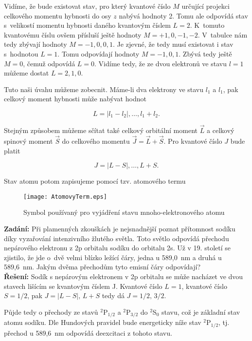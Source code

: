 Vidíme, že bude existovat stav, pro který kvantové číslo $M$ určující projekci celkového momentu hybnosti do osy $z$ nabývá hodnoty 2. Tomu ale odpovídá stav s~velikostí momentu hybnosti daného kvantovým číslem $L = 2$. K~tomuto kvantovému číslu ovšem přísluší ještě hodnoty $M=+1,0,-1,-2$. V~tabulce nám tedy zbývají hodnoty $M =-1,0,0,1$. Je zjevné, že tedy musí existovat i stav s~hodnotou $L=1$. Tomu odpovídají hodnoty $M=-1,0, 1$. Zbývá tedy ještě $M=0$, čemuž odpovídá $L=0$. Vidíme tedy, že ze dvou elektronů ve stavu $l=1$ můžeme dostat $L=2,1,0$. 

Tuto naši úvahu můžeme zobecnit. Máme-li dva elektrony ve stavu $l_1$ a $l_1$, pak celkový moment hybnosti může nabývat hodnot

\begin{equation}
L = \vert l_1 - l_2 \vert , \dots , l_1 + l_2.
\label{rov:VE-65}
\end{equation}

Stejným způsobem můžeme sčítat také celkový orbitální moment $\vec{L}$ a celkový spinový moment $\vec{S}$ do celkového momentu $\vec{J} = \vec{L} + \vec{S}$. Pro kvantové číslo $J$ bude platit

\begin{equation}
J = \vert L - S \vert, \dots, L+S.
\label{rov:VE-66}
\end{equation}


Stav atomu potom zapisujeme pomocí tzv. atomového termu


\begin{figure} [ht]
\centering
\texttt{[image: AtomovyTerm.eps]}
\caption[Atomové termy]{Symbol používaný pro vyjádření stavu mnoho-elektronového atomu}
\label{obr:ATerm}
\end{figure}

\begin{priklad}
\textbf{Zadání:} Při plamenných zkouškách je nejsnadnější poznat přítomnost sodíku díky vyzařování intenzivního žlutého světla. Toto světlo odpovídá přechodu nepárového elektronu z 2p orbitalu sodíku do orbitalu 2s. Už v 19. století se zjistilo, že jde o~dvě velmi blízko ležící čáry,  jedna u 589,0~nm a druhá u 589,6~nm. Jakým dvěma přechodům tyto emisní čáry odpovídají?\\[0.1cm]
\textbf{Řešení:} Sodík s nepárovým  elektronem v 2p orbitalu se může nacházet ve dvou stavech lišícím se kvantovým číslem J. Kvantové číslo $L=1$, kvantové číslo $S=1/2$, pak $J=|L-S|,\, L+S$ tedy dá $J=1/2,\,3/2$.

Půjde tedy o přechody ze stavů $^2$P$_{1/2}$ a $^2$P$_{3/2}$ do $^2$S$_0$ stavu, což je základní stav atomu sodíku. Dle Hundových pravidel bude energeticky níže stav $^2$P$_{1/2}$, tj. přechod u 589,6~nm odpovídá deexcitaci z tohoto stavu.
\end{priklad}


